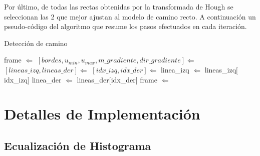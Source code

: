 \documentclass[a4paper,spanish]{article}
\begin{document}
 Por último, de todas las rectas obtenidas por la transformada de Hough se seleccionan las 2 que mejor ajustan al modelo de camino recto. A continuación un pseudo-código del algoritmo que resume los pasos efectuados en cada iteración. 

\begin{algorithm}[H]
\caption{Detección de camino}
\label{alg:overview}
\begin{algorithmic}
	
    	\State frame $\Leftarrow$ 
        \State {}
        \State $[bordes,u_{min},u_{max},m\_gradiente,dir\_gradiente] \Leftarrow$ 
        \State $[lineas\_izq,lineas\_der] \Leftarrow$ 
        \State $[idx\_izq,idx\_der] \Leftarrow$ 
        	\State linea\_izq $\Leftarrow$ lineas\_izq$[$idx\_izq$]$
            \State linea\_der $\Leftarrow$ lineas\_der$[$idx\_der$]$
        	\State frame $\Leftarrow$ 
        \EndIf
        \State {}
    \EndWhile
\EndProcedure
\end{algorithmic}
\end{algorithm}


\section{Detalles de  Implementación}
\subsection{Ecualización de Histograma}
\end{document}

